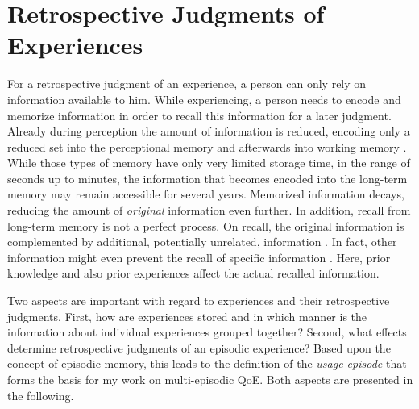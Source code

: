 \section{Retrospective Judgments of Experiences}\label{chap:03}
For a retrospective judgment of an experience, a person can only rely on information available to him.
While experiencing, a person needs to encode and memorize information in order to recall this information for a later judgment.
Already during perception the amount of information is reduced, encoding only a reduced set into the perceptional memory and afterwards into working memory \citep[][p.~8f.]{raake_speech_2006}.
While those types of memory have only very limited storage time, in the range of seconds up to minutes, the information that becomes encoded into the long-term memory may remain accessible for several years.
Memorized information decays, reducing the amount of \emph{original} information even further.
In addition, recall from long-term memory is not a perfect process.
On recall, the original information is complemented by additional, potentially unrelated, information \citep[\cf,][]{schacter_seven_2003}.
In fact, other information might even prevent the recall of specific information \citep[\cf,][]{schacter_seven_2003}.
Here, prior knowledge and also prior experiences affect the actual recalled information.

Two aspects are important with regard to experiences and their retrospective judgments.
First, how are experiences stored and in which manner is the information about individual experiences grouped together?
Second, what effects determine retrospective judgments of an episodic experience?
Based upon the concept of episodic memory, this leads to the definition of the \emph{usage episode} that forms the basis for my work on multi-episodic \ac{QoE}.
Both aspects are presented in the following.

